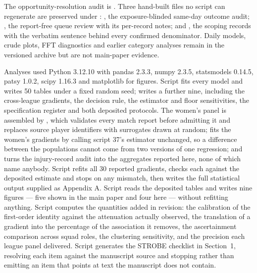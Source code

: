 \documentclass[11pt]{article}
\begin{document}
\endgroup
The opportunity-resolution audit is . Three hand-built files no script can regenerate are preserved under : , the exposure-blinded same-day outcome audit; , the report-free queue review with its per-record notes; and , the scoping records with the verbatim sentence behind every confirmed denominator. Daily models, crude plots, FFT diagnostics and earlier category analyses remain in the versioned archive but are not main-paper evidence.

Analyses used Python 3.12.10 with pandas 2.3.3, numpy 2.3.5, statsmodels 0.14.5, patsy 1.0.2, scipy 1.16.3 and matplotlib for figures. Script  fits every model and writes 50  tables under a fixed random seed;  writes a further nine, including the cross-league gradients, the decision rule, the estimator and floor sensitivities, the specification register and both deposited protocols. The women's panel is assembled by , which validates every match report before admitting it and replaces source player identifiers with surrogates drawn at random;  fits the women's gradients by calling script 37's estimator unchanged, so a difference between the populations cannot come from two versions of one regression; and  turns the injury-record audit into the aggregates reported here, none of which name anybody. Script  refits all 30 reported gradients, checks each against the deposited estimate and stops on any mismatch, then writes the full statistical output supplied as Appendix A. Script  reads the deposited tables and writes nine figures --- five shown in the main paper and four here --- without refitting anything. Script  computes the quantities added in revision: the calibration of the first-order identity against the attenuation actually observed, the translation of a gradient into the percentage of the association it removes, the ascertainment comparison across squad roles, the clustering sensitivity, and the precision each league panel delivered. Script  generates the STROBE checklist in Section~1, resolving each item against the manuscript source and stopping rather than emitting an item that points at text the manuscript does not contain.

\begingroup
\footnotesize

\endgroup
\end{document}
